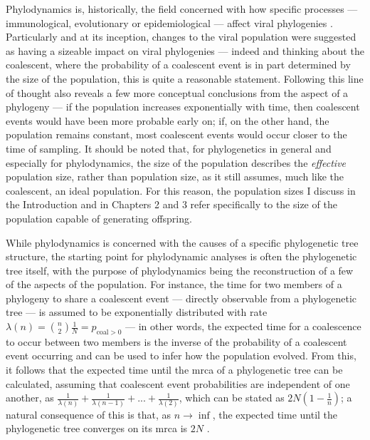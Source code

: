 Phylodynamics is, historically, the field concerned with how specific processes --- immunological, evolutionary or epidemiological --- affect viral phylogenies \cite{Volz2013-ey}. Particularly and at its inception, changes to the viral population were suggested as having a sizeable impact on viral phylogenies \cite{Grenfell2004-ip} --- indeed and thinking about the coalescent, where the probability of a coalescent event is in part determined by the size of the population, this is quite a reasonable statement. Following this line of thought also reveals a few more conceptual conclusions from the aspect of a phylogeny --- if the population increases exponentially with time, then coalescent events would have been more probable early on; if, on the other hand, the population remains constant, most coalescent events would occur closer to the time of sampling. It should be noted that, for phylogenetics in general and especially for phylodynamics, the size of the population describes the \textit{effective} population size, rather than population size, as it still assumes, much like the coalescent, an ideal population. For this reason, the population sizes I discuss in the Introduction and in Chapters 2 and 3 refer specifically to the size of the population capable of generating offspring.

While phylodynamics is concerned with the causes of a specific phylogenetic tree structure, the starting point for phylodynamic analyses is often the phylogenetic tree itself, with the purpose of phylodynamics being the reconstruction of a few of the aspects of the population. For instance, the time for two members of a phylogeny to share a coalescent event --- directly observable from a phylogenetic tree --- is assumed to be exponentially distributed with rate $\lambda(n) = \binom{n}{2}\frac{1}{N} = p_{\mathrm{coal}>0}$ --- in other words, the expected time for a coalescence to occur between two members is the inverse of the probability of a coalescent event occurring and can be used to infer how the population evolved. From this, it follows that the expected time until the \ac{mrca} of a phylogenetic tree can be calculated, assuming that coalescent event probabilities are independent of one another, as $\frac{1}{\lambda(n)} + \frac{1}{\lambda(n-1)} + ... + \frac{1}{\lambda(2)}$, which can be stated as $2N(1-\frac{1}{n})$; a natural consequence of this is that, as $n \rightarrow \inf$, the expected time until the phylogenetic tree converges on its \ac{mrca} is $2N$ \cite{Volz2013-ey}. 

